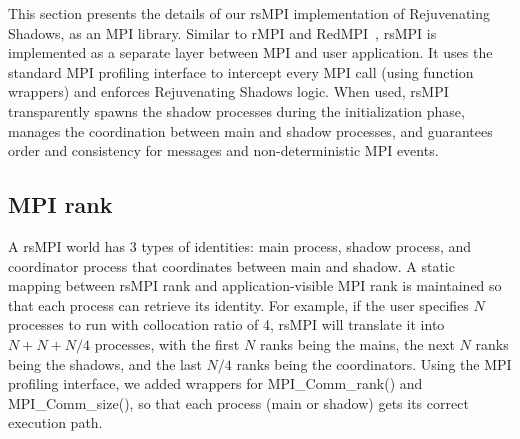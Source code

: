 This section presents the details of our rsMPI implementation of Rejuvenating Shadows, as an MPI library. 
Similar to rMPI and RedMPI~\cite{ferreira_sc_2011,fiala_2012_sdc}, rsMPI is implemented as a separate layer between MPI and user application. It uses the standard MPI profiling interface to intercept every MPI call (using function wrappers) and enforces Rejuvenating Shadows logic. 
When used, rsMPI transparently spawns the shadow processes during the initialization phase, manages the coordination between main and shadow processes, and guarantees order and consistency for messages and non-deterministic MPI events.

\subsection{MPI rank}
A rsMPI world has 3 types of identities: main process, shadow process, and coordinator process that coordinates between main and shadow. A static mapping between rsMPI rank and application-visible MPI rank is maintained so that each process can retrieve its identity. For example, if the user specifies $N$ processes to run with collocation ratio of 4, rsMPI will translate it into $N + N + N/4$ processes, %
with the first $N$ ranks being the mains, the next $N$ ranks being the shadows, and the last $N/4$ ranks being the coordinators. 
Using the MPI profiling interface, we added wrappers for MPI\_Comm\_rank() and MPI\_Comm\_size(), so that each process (main or shadow) gets its correct execution path.


